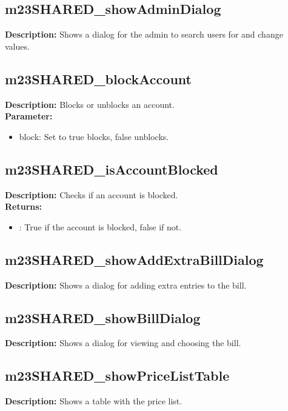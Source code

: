 \subsection{m23SHARED\_showAdminDialog}
\textbf{Description:} Shows a dialog for the admin to search users for and change values.\\

\subsection{m23SHARED\_blockAccount}
\textbf{Description:} Blocks or unblocks an account.\\
\textbf{Parameter:}
\begin{itemize}
\item block: Set to true blocks, false unblocks.
\end{itemize}

\subsection{m23SHARED\_isAccountBlocked}
\textbf{Description:} Checks if an account is blocked.\\
\textbf{Returns:}
\begin{itemize}
\item : True if the account is blocked, false if not.
\end{itemize}

\subsection{m23SHARED\_showAddExtraBillDialog}
\textbf{Description:} Shows a dialog for adding extra entries to the bill.\\

\subsection{m23SHARED\_showBillDialog}
\textbf{Description:} Shows a dialog for viewing and choosing the bill.\\

\subsection{m23SHARED\_showPriceListTable}
\textbf{Description:} Shows a table with the price list.\\

